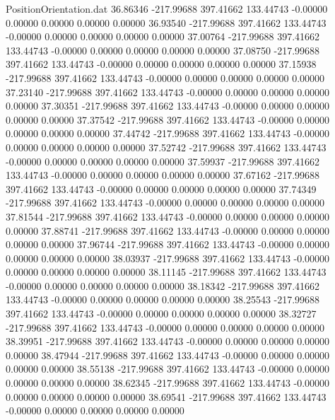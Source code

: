 \begin{filecontents}{PositionOrientation.dat}
  36.86346 -217.99688  397.41662   133.44743   -0.00000    0.00000    0.00000    0.00000    0.00000
  36.93540 -217.99688  397.41662   133.44743   -0.00000    0.00000    0.00000    0.00000    0.00000
  37.00764 -217.99688  397.41662   133.44743   -0.00000    0.00000    0.00000    0.00000    0.00000
  37.08750 -217.99688  397.41662   133.44743   -0.00000    0.00000    0.00000    0.00000    0.00000
  37.15938 -217.99688  397.41662   133.44743   -0.00000    0.00000    0.00000    0.00000    0.00000
  37.23140 -217.99688  397.41662   133.44743   -0.00000    0.00000    0.00000    0.00000    0.00000
  37.30351 -217.99688  397.41662   133.44743   -0.00000    0.00000    0.00000    0.00000    0.00000
  37.37542 -217.99688  397.41662   133.44743   -0.00000    0.00000    0.00000    0.00000    0.00000
  37.44742 -217.99688  397.41662   133.44743   -0.00000    0.00000    0.00000    0.00000    0.00000
  37.52742 -217.99688  397.41662   133.44743   -0.00000    0.00000    0.00000    0.00000    0.00000
  37.59937 -217.99688  397.41662   133.44743   -0.00000    0.00000    0.00000    0.00000    0.00000
  37.67162 -217.99688  397.41662   133.44743   -0.00000    0.00000    0.00000    0.00000    0.00000
  37.74349 -217.99688  397.41662   133.44743   -0.00000    0.00000    0.00000    0.00000    0.00000
  37.81544 -217.99688  397.41662   133.44743   -0.00000    0.00000    0.00000    0.00000    0.00000
  37.88741 -217.99688  397.41662   133.44743   -0.00000    0.00000    0.00000    0.00000    0.00000
  37.96744 -217.99688  397.41662   133.44743   -0.00000    0.00000    0.00000    0.00000    0.00000
  38.03937 -217.99688  397.41662   133.44743   -0.00000    0.00000    0.00000    0.00000    0.00000
  38.11145 -217.99688  397.41662   133.44743   -0.00000    0.00000    0.00000    0.00000    0.00000
  38.18342 -217.99688  397.41662   133.44743   -0.00000    0.00000    0.00000    0.00000    0.00000
  38.25543 -217.99688  397.41662   133.44743   -0.00000    0.00000    0.00000    0.00000    0.00000
  38.32727 -217.99688  397.41662   133.44743   -0.00000    0.00000    0.00000    0.00000    0.00000
  38.39951 -217.99688  397.41662   133.44743   -0.00000    0.00000    0.00000    0.00000    0.00000
  38.47944 -217.99688  397.41662   133.44743   -0.00000    0.00000    0.00000    0.00000    0.00000
  38.55138 -217.99688  397.41662   133.44743   -0.00000    0.00000    0.00000    0.00000    0.00000
  38.62345 -217.99688  397.41662   133.44743   -0.00000    0.00000    0.00000    0.00000    0.00000
  38.69541 -217.99688  397.41662   133.44743   -0.00000    0.00000    0.00000    0.00000    0.00000

\end{filecontents}
